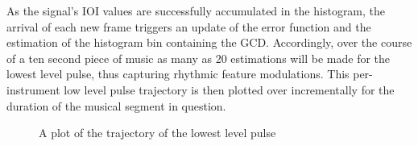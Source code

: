 As the signal's IOI values are successfully accumulated in the
histogram, the arrival of each new frame triggers an update of the error
function and the estimation of the histogram bin containing the GCD. Accordingly,
over the course of a ten second piece of music as many as 20 estimations will
be made for the lowest level pulse, thus capturing rhythmic feature modulations.
This per-instrument low level pulse trajectory is then plotted over
incrementally for the duration of the musical segment in question.


\begin{figure}[thp]
  \begin{center}
    \caption{A plot of the trajectory of the lowest level pulse}
    \label{lowestlevelpulse}
  \end{center}
\end{figure}